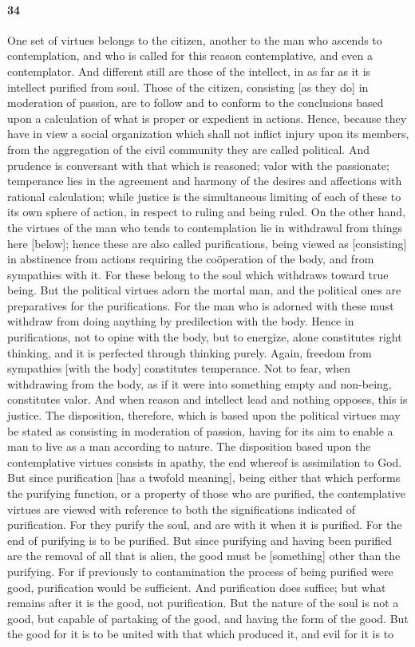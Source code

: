 \documentclass[12pt]{article}
\begin{document}
\paragraph{34} One set of virtues belongs to the citizen, another to the man who ascends to contemplation, and who is called for this reason contemplative, and even a contemplator. And different still are those of the intellect, in as far as it is intellect purified from soul. Those of the citizen, consisting [as they do] in moderation of passion, are to follow and to conform to the conclusions based upon a calculation of what is proper or expedient in actions. Hence, because they have in view a social organization which shall not inflict injury upon its members, from the aggregation of the civil community they are called political. And prudence is conversant with that which is reasoned; valor with the passionate; temperance lies in the agreement and harmony of the desires and affections with rational calculation; while justice is the simultaneous limiting of each of these to its own sphere of action, in respect to ruling and being ruled. On the other hand, the virtues of the man who tends to contemplation lie in withdrawal from things here [below]; hence these are also called purifications, being viewed as [consisting] in abstinence from actions requiring the co\"{o}peration of the body, and from sympathies with it. For these belong to the soul which withdraws toward true being. But the political virtues adorn the mortal man, and the political ones are preparatives for the purifications. For the man who is adorned with these must withdraw from doing anything by predilection with the body. Hence in purifications, not to opine with the body, but to energize, alone constitutes right thinking, and it is perfected through thinking purely. Again, freedom from sympathies [with the body] constitutes temperance. Not to fear, when withdrawing from the body, as if it were into something empty and non-being, constitutes valor. And when reason and intellect lead and nothing opposes, this is justice. The disposition, therefore, which is based upon the political virtues may be stated as consisting in moderation of passion, having for its aim to enable a man to live as a man according to nature. The disposition based upon the contemplative virtues consists in apathy, the end whereof is assimilation to God. But since purification [has a twofold meaning], being either that which performs the purifying function, or a property of those who are purified, the contemplative virtues are viewed with reference to both the significations indicated of purification. For they purify the soul, and are with it when it is purified. For the end of purifying is to be purified. But since purifying and having been purified are the removal of all that is alien, the good must be [something] other than the purifying. For if previously to contamination the process of being purified were good, purification would be sufficient. And purification does suffice; but what remains after it is the good, not purification. But the nature of the soul is not a good, but capable of partaking of the good, and having the form of the good. But the good for it is to be united with that which produced it, and evil for it is to 
\end{document}
